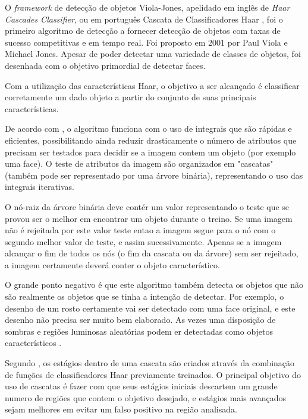 O \textit{framework} de detecção de objetos Viola-Jones, apelidado em inglês de \textit{Haar Cascades Classifier}, ou em português Cascata de Classificadores Haar \cite{gustavo_cascata}, foi o primeiro algoritmo de detecção a fornecer detecção de objetos com taxas de sucesso competitivas e em tempo real. Foi proposto em 2001 por Paul Viola e Michael Jones. Apesar de poder detectar uma variedade de classes de objetos, foi desenhada com o objetivo primordial de detectar faces.

Com a utilização das características Haar, o objetivo a ser alcançado é classificar corretamente um dado objeto a partir do conjunto de suas principais características. 

De acordo com \cite{drmathew_java_programming}, o algoritmo funciona com o uso de integrais que são rápidas e eficientes, possibilitando ainda reduzir drasticamente o número de atributos que precisam ser testados para decidir se a imagem contem um objeto (por exemplo uma face). O teste de atributos da imagem são organizados em "cascatas" (também pode ser representado por uma árvore binária), representando o uso das integrais iterativas.

O nó-raiz da árvore binária deve contér um valor representando o teste que se provou ser o melhor em encontrar um objeto durante o treino. Se uma imagem não é rejeitada por este valor teste entao a imagem segue para o nó com o segundo melhor valor de teste, e assim sucessivamente. Apenas se a imagem alcançar o fim de todos os nós (o fim da cascata ou da árvore) sem ser rejeitado, a imagem certamente deverá conter o objeto característico.

O grande ponto negativo é que este algoritmo também detecta os objetos que não são realmente os objetos que se tinha a intenção de detectar\cite{drmathew_java_programming}. Por exemplo, o desenho de um rosto certamente vai ser detectado com uma face original, e este desenho não precisa ser muito bem elaborado. As vezes uma disposição de sombras e regiões luminosas aleatórias podem er detectadas como objetos característicos .

Segundo \cite{gustavo_cascata}, os estágios dentro de uma cascata são criados através da combinação de funções de classificadores Haar previamente treinados. O principal objetivo do uso de cascatas é fazer com que seus estágios iniciais descartem um grande numero de regiões que contem o objetivo desejado, e estágios mais avançados sejam melhores em evitar um falso positivo na região analisada. 

